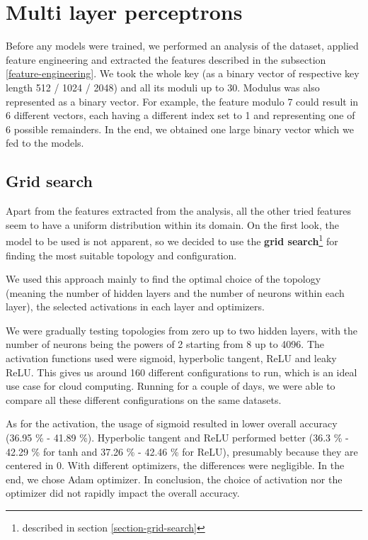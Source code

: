 \section{Multi layer perceptrons}

Before any models were trained, we performed an analysis of the dataset, applied feature engineering and extracted the features described in the subsection \ref{feature-engineering}. We took the whole key (as a binary vector of respective key length 512 / 1024 / 2048) and all its moduli up to 30. Modulus was also represented as a binary vector. For example, the feature modulo 7 could result in 6 different vectors, each having a different index set to 1 and representing one of 6 possible remainders. In the end, we obtained one large binary vector which we fed to the models.

\subsection*{Grid search}

Apart from the features extracted from the analysis, all the other tried features seem to have a uniform distribution within its domain. On the first look, the model to be used is not apparent, so we decided to use the \textbf{grid search}\footnote{described in section \ref{section-grid-search}} for finding the most suitable topology and configuration. 

We used this approach mainly to find the optimal choice of the topology (meaning the number of hidden layers and the number of neurons within each layer), the selected activations in each layer and optimizers.

We were gradually testing topologies from zero up to two hidden layers, with the number of neurons being the powers of 2 starting from 8 up to 4096. The activation functions used were sigmoid, hyperbolic tangent, ReLU and leaky ReLU. This gives us around 160 different configurations to run, which is an ideal use case for cloud computing. Running for a couple of days, we were able to compare all these different configurations on the same datasets.

As for the activation, the usage of sigmoid resulted in lower overall accuracy (36.95 \% - 41.89 \%). Hyperbolic tangent and ReLU performed better (36.3 \% - 42.29 \% for tanh and 37.26 \% - 42.46 \% for ReLU), presumably because they are centered in 0. With different optimizers, the differences were negligible. In the end, we chose Adam optimizer. In conclusion, the choice of activation nor the optimizer did not rapidly impact the overall accuracy. 

